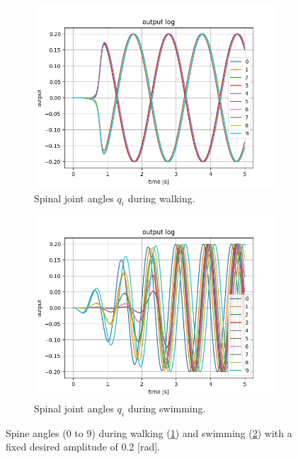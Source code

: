 \documentclass{cmc}
\begin{document}
\begin{figure}[!ht]
  \begin{subfigure}[b]{0.48\textwidth}
    \includegraphics[width=\textwidth]{figures/9a/Spine_Angle_Walking.png}
    \caption{Spinal joint angles $q_i$ during walking.}
    \label{fig:Spine_Angle_Walking}
  \end{subfigure}
  \begin{subfigure}[b]{0.48\textwidth}
    \includegraphics[width=\textwidth]{figures/9a/Spine_Angle_Swimming.png}
    \caption{Spinal joint angles $q_i$ during swimming.}
    \label{fig:Spine_Angle_Swimming}
  \end{subfigure}
  \caption{Spine angles (0 to 9) during walking (\ref{fig:Spine_Angle_Walking}) and swimming (\ref{fig:Spine_Angle_Swimming}) with a fixed desired amplitude of 0.2 [rad].}
  \label{fig:Spine_Angle}
\end{figure}
\end{document}
